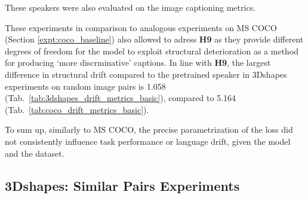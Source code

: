 These speakers were also evaluated on the image captioning metrics. 

These experiments in comparison to analogous experiments on MS COCO (Section \ref{expt:coco_baseline}) also allowed to adress \textbf{H9} as they provide different degrees of freedom for the model to exploit structural deterioration as a method for producing `more discrminative' captions. In line with \textbf{H9}, the largest difference in structural drift compared to the pretrained speaker in 3Dshapes experiments on random image pairs is 1.058 (Tab.~\ref{tab:3dshapes_drift_metrics_basic}), compared to 5.164 (Tab.~\ref{tab:coco_drift_metrics_basic}). 

To sum up, similarly to MS COCO, the precise parametrization of the loss did not consistently influence task performance or language drift, given the model and the dataset.

\subsection{3Dshapes: Similar Pairs Experiments}
\label{expt:3dsapes_similar}

